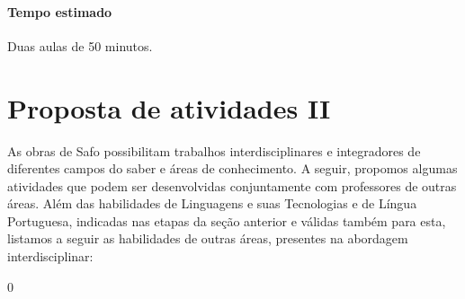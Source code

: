 \documentclass[12pt]{extarticle}
\begin{document}
\paragraph{Tempo estimado} Duas aulas de 50 minutos.



\section{Proposta de atividades II}


As obras de Safo possibilitam trabalhos interdisciplinares e
integradores de diferentes campos do saber e áreas de conhecimento. A
seguir, propomos algumas atividades que podem ser desenvolvidas
conjuntamente com professores de outras áreas. Além das habilidades de
Linguagens e suas Tecnologias e de Língua Portuguesa, indicadas nas
etapas da seção anterior e válidas também para esta, listamos a seguir
as habilidades de outras áreas, presentes na abordagem interdisciplinar:

0





\end{document}
